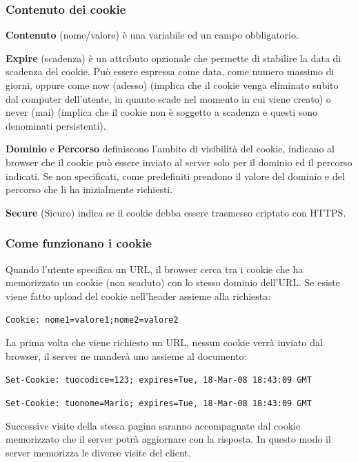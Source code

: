         \subsubsection{Contenuto dei cookie}
            \textbf{Contenuto} (nome/valore) è una variabile ed un campo obbligatorio.
        
            \textbf{Expire} (scadenza) è un attributo opzionale che permette di stabilire la data di scadenza del cookie. Può essere espressa come data, come numero massimo di giorni, oppure come now (adesso) (implica che il cookie venga eliminato subito dal computer dell'utente, in quanto scade nel momento in cui viene creato) o never (mai) (implica che il cookie non è soggetto a scadenza e questi sono denominati persistenti).
        
            \textbf{Dominio} e \textbf{Percorso} definiscono l'ambito di visibilità del cookie, indicano al browser che il cookie può essere inviato al server solo per il dominio ed il percorso indicati. Se non specificati, come predefiniti prendono il valore del dominio e del percorso che li ha inizialmente richiesti.
        
            \textbf{Secure} (Sicuro) indica se il cookie debba essere trasmesso criptato con HTTPS.

        \subsubsection{Come funzionano i cookie}
            Quando l'utente specifica un URL, il browser cerca tra i cookie che ha memorizzato un cookie (non scaduto) con lo stesso dominio dell'URL. Se esiste viene fatto upload del cookie nell'header assieme alla richiesta:
        
            \begin{center}
                \verb-Cookie: nome1=valore1;nome2=valore2-
            \end{center}
        
            La prima volta che viene richiesto un URL, nessun cookie verrà inviato dal browser, il server ne manderà uno assieme al documento:
        
            \verb|Set-Cookie: tuocodice=123; expires=Tue, 18-Mar-08 18:43:09 GMT|
            
            \verb|Set-Cookie: tuonome=Mario; expires=Tue, 18-Mar-08 18:43:09 GMT|

            Successive visite della stessa pagina saranno accompagnate dal cookie memorizzato che il server potrà aggiornare con la risposta. In questo modo il server memorizza le diverse visite del client.
        
